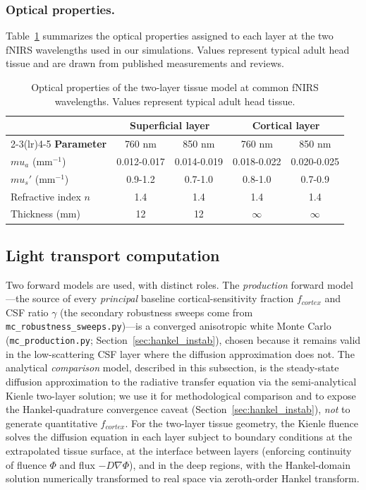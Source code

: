 \documentclass[11pt]{article}
\def\mu{mu}%
\def\mathrm#1{#1}%
\def\,{ }%
\begin{document}
\subsubsection{Optical properties.}
Table~\ref{tab:optical} summarizes the optical properties assigned to each layer at the two fNIRS wavelengths used in our simulations. Values represent typical adult head tissue and are drawn from published measurements and reviews\cite{r10,r11,r12,r24}.

\begin{table}[ht]
\centering
\caption{Optical properties of the two-layer tissue model at common fNIRS wavelengths. Values represent typical adult head tissue.}
\label{tab:optical}
\begin{tabular}{@{}lcccc@{}}
\toprule
& \multicolumn{2}{c}{\textbf{Superficial layer}} & \multicolumn{2}{c}{\textbf{Cortical layer}} \\
\cmidrule(lr){2-3}\cmidrule(lr){4-5}
\textbf{Parameter} & 760\,nm & 850\,nm & 760\,nm & 850\,nm \\
\midrule
$\mu_a$ (mm$^{-1}$) & 0.012-0.017 & 0.014-0.019 & 0.018-0.022 & 0.020-0.025 \\
$\mu_s'$ (mm$^{-1}$) & 0.9-1.2 & 0.7-1.0 & 0.8-1.0 & 0.7-0.9 \\
Refractive index $n$ & 1.4 & 1.4 & 1.4 & 1.4 \\
Thickness (mm) & 12 & 12 & $\infty$ & $\infty$ \\
\bottomrule
\end{tabular}
\end{table}

\subsection{Light transport computation}

Two forward models are used, with distinct roles. The \emph{production} forward model---the source of every \emph{principal} baseline cortical-sensitivity fraction $f_{\mathrm{cortex}}$ and CSF ratio $\gamma$ (the secondary robustness sweeps come from \texttt{mc\_robustness\_sweeps.py})---is a converged anisotropic white Monte Carlo (\texttt{mc\_production.py}; Section~\ref{sec:hankel_instab}), chosen because it remains valid in the low-scattering CSF layer where the diffusion approximation does not. The analytical \emph{comparison} model, described in this subsection, is the steady-state diffusion approximation to the radiative transfer equation\cite{r25,r26} via the semi-analytical Kienle two-layer solution\cite{r40}; we use it for methodological comparison and to expose the Hankel-quadrature convergence caveat (Section~\ref{sec:hankel_instab}), \emph{not} to generate quantitative $f_{\mathrm{cortex}}$. For the two-layer tissue geometry, the Kienle fluence solves the diffusion equation in each layer subject to boundary conditions at the extrapolated tissue surface, at the interface between layers (enforcing continuity of fluence $\Phi$ and flux $-D\nabla\Phi$), and in the deep regions, with the Hankel-domain solution numerically transformed to real space via zeroth-order Hankel transform.
\end{document}
